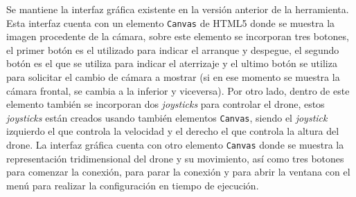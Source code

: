 Se mantiene la interfaz gráfica existente en la versión anterior de la herramienta. Esta interfaz cuenta con un elemento \texttt{Canvas} de HTML5 donde se muestra la imagen procedente de la cámara, sobre este elemento se incorporan tres botones, el primer botón es el utilizado para indicar el arranque y despegue, el segundo botón es el que se utiliza para indicar el aterrizaje y el ultimo botón se utiliza para solicitar el cambio de cámara a mostrar (si en ese momento se muestra la cámara frontal, se cambia a la inferior y viceversa). Por otro lado, dentro de este elemento también se incorporan dos \textit{joysticks} para controlar el drone, estos \textit{joysticks} están creados usando también elementos \texttt{Canvas}, siendo el \textit{joystick} izquierdo el que controla la velocidad y el derecho el que controla la altura del drone. La interfaz gráfica cuenta con otro elemento \texttt{Canvas} donde se muestra la representación tridimensional del drone y su movimiento, así como tres botones para comenzar la conexión, para parar la conexión y para abrir la ventana con el menú para realizar la configuración en tiempo de ejecución.
